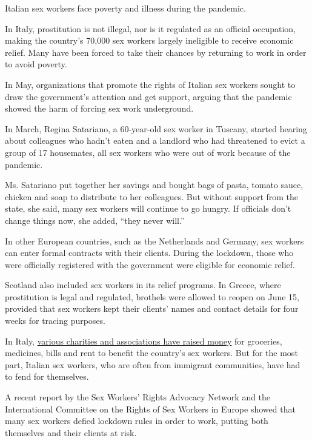 Italian sex workers face poverty and illness during the pandemic.

In Italy, prostitution is not illegal, nor is it regulated as an
official occupation, making the country's 70,000 sex workers largely
ineligible to receive economic relief. Many have been forced to take
their chances by returning to work in order to avoid poverty.

In May, organizations that promote the rights of Italian sex workers
sought to draw the government's attention and get support, arguing that
the pandemic showed the harm of forcing sex work underground.

In March, Regina Satariano, a 60-year-old sex worker in Tuscany, started
hearing about colleagues who hadn't eaten and a landlord who had
threatened to evict a group of 17 housemates, all sex workers who were
out of work because of the pandemic.

Ms. Satariano put together her savings and bought bags of pasta, tomato
sauce, chicken and soap to distribute to her colleagues. But without
support from the state, she said, many sex workers will continue to go
hungry. If officials don't change things now, she added, ``they never
will.''

In other European countries, such as the Netherlands and Germany, sex
workers can enter formal contracts with their clients. During the
lockdown, those who were officially registered with the government were
eligible for economic relief.

Scotland also included sex workers in its relief programs. In Greece,
where prostitution is legal and regulated, brothels were allowed to
reopen on June 15, provided that sex workers kept their clients' names
and contact details for four weeks for tracing purposes.

In Italy,
\href{https://www.produzionidalbasso.com/project/covid19-nessuna-da-sola-solidarieta-immediata-alle-lavoratrici-sessuali-piu-colpite-dall-emergenza/}{various
charities and associations have raised money} for groceries, medicines,
bills and rent to benefit the country's sex workers. But for the most
part, Italian sex workers, who are often from immigrant communities,
have had to fend for themselves.

A recent report by the Sex Workers' Rights Advocacy Network and the
International Committee on the Rights of Sex Workers in Europe showed
that many sex workers defied lockdown rules in order to work, putting
both themselves and their clients at risk.

